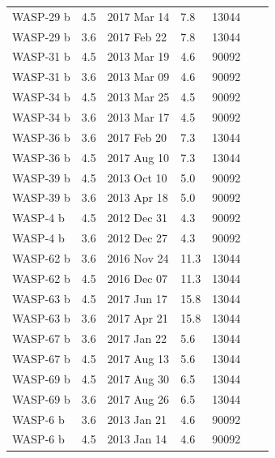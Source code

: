 \begin{longtable}[h]{lllllll}
WASP-29 b    &               4.5 &   2017 Mar 14 &         7.8 &       13044 \\
WASP-29 b    &               3.6 &   2017 Feb 22 &         7.8 &       13044 \\
WASP-31 b   &               4.5 &   2013 Mar 19 &         4.6 &       90092 \\
WASP-31 b   &               3.6 &   2013 Mar 09 &         4.6 &       90092 \\
WASP-34 b   &               4.5 &   2013 Mar 25 &         4.5 &       90092 \\
WASP-34 b   &               3.6 &   2013 Mar 17 &         4.5 &       90092 \\
WASP-36 b    &               3.6 &   2017 Feb 20 &         7.3 &       13044 \\
WASP-36 b    &               4.5 &   2017 Aug 10 &         7.3 &       13044 \\
WASP-39 b   &               4.5 &   2013 Oct 10 &         5.0 &       90092 \\
WASP-39 b   &               3.6 &   2013 Apr 18 &         5.0 &       90092 \\
WASP-4 b    &               4.5 &   2012 Dec 31 &         4.3 &       90092 \\
WASP-4 b    &               3.6 &   2012 Dec 27 &         4.3 &       90092 \\
WASP-62 b    &               3.6 &   2016 Nov 24 &        11.3 &       13044 \\
WASP-62 b    &               4.5 &   2016 Dec 07 &        11.3 &       13044 \\
WASP-63 b    &               4.5 &   2017 Jun 17 &        15.8 &       13044 \\
WASP-63 b    &               3.6 &   2017 Apr 21 &        15.8 &       13044 \\
WASP-67 b    &               3.6 &   2017 Jan 22 &         5.6 &       13044 \\
WASP-67 b    &               4.5 &   2017 Aug 13 &         5.6 &       13044 \\
WASP-69 b    &               4.5 &   2017 Aug 30 &         6.5 &       13044 \\
WASP-69 b    &               3.6 &   2017 Aug 26 &         6.5 &       13044 \\
WASP-6 b    &               3.6 &   2013 Jan 21 &         4.6 &       90092 \\
WASP-6 b    &               4.5 &   2013 Jan 14 &         4.6 &       90092 \\

\end{longtable}
